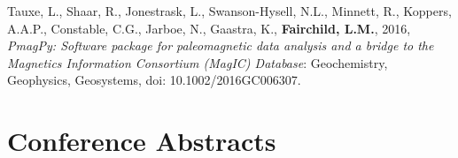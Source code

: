 \documentclass[11pt,a4paper,sans]{moderncv}        %
\begin{document}
\begin{etaremune}
\vspace{3pt}

\item{Tauxe, L., Shaar, R., Jonestrask, L., Swanson-Hysell, N.L., Minnett, R., Koppers, A.A.P., Constable, C.G., Jarboe, N., Gaastra,  K., \textbf{Fairchild, L.M.}, 2016, \textit{PmagPy: Software package for paleomagnetic data analysis and a bridge to the Magnetics Information Consortium (MagIC) Database}: Geochemistry, Geophysics, Geosystems, doi: 10.1002/2016GC006307.}

\end{etaremune}

\section{Conference Abstracts}
\end{document}
